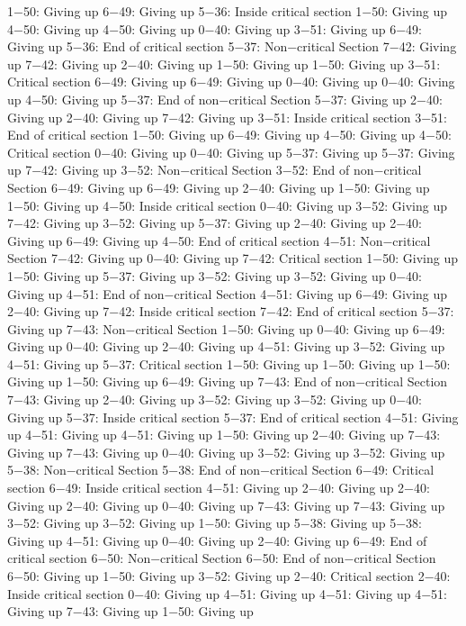1−50: Giving up
6−49: Giving up
5−36: Inside critical section
1−50: Giving up
4−50: Giving up
4−50: Giving up
0−40: Giving up
3−51: Giving up
6−49: Giving up
5−36: End of critical section
5−37: Non−critical Section
7−42: Giving up
7−42: Giving up
2−40: Giving up
1−50: Giving up
1−50: Giving up
3−51: Critical section
6−49: Giving up
6−49: Giving up
0−40: Giving up
0−40: Giving up
4−50: Giving up
5−37: End of non−critical Section
5−37: Giving up
2−40: Giving up
2−40: Giving up
7−42: Giving up
3−51: Inside critical section
3−51: End of critical section
1−50: Giving up
6−49: Giving up
4−50: Giving up
4−50: Critical section
0−40: Giving up
0−40: Giving up
5−37: Giving up
5−37: Giving up
7−42: Giving up
3−52: Non−critical Section
3−52: End of non−critical Section
6−49: Giving up
6−49: Giving up
2−40: Giving up
1−50: Giving up
1−50: Giving up
4−50: Inside critical section
0−40: Giving up
3−52: Giving up
7−42: Giving up
3−52: Giving up
5−37: Giving up
2−40: Giving up
2−40: Giving up
6−49: Giving up
4−50: End of critical section
4−51: Non−critical Section
7−42: Giving up
0−40: Giving up
7−42: Critical section
1−50: Giving up
1−50: Giving up
5−37: Giving up
3−52: Giving up
3−52: Giving up
0−40: Giving up
4−51: End of non−critical Section
4−51: Giving up
6−49: Giving up
2−40: Giving up
7−42: Inside critical section
7−42: End of critical section
5−37: Giving up
7−43: Non−critical Section
1−50: Giving up
0−40: Giving up
6−49: Giving up
0−40: Giving up
2−40: Giving up
4−51: Giving up
3−52: Giving up
4−51: Giving up
5−37: Critical section
1−50: Giving up
1−50: Giving up
1−50: Giving up
1−50: Giving up
6−49: Giving up
7−43: End of non−critical Section
7−43: Giving up
2−40: Giving up
3−52: Giving up
3−52: Giving up
0−40: Giving up
5−37: Inside critical section
5−37: End of critical section
4−51: Giving up
4−51: Giving up
4−51: Giving up
1−50: Giving up
2−40: Giving up
7−43: Giving up
7−43: Giving up
0−40: Giving up
3−52: Giving up
3−52: Giving up
5−38: Non−critical Section
5−38: End of non−critical Section
6−49: Critical section
6−49: Inside critical section
4−51: Giving up
2−40: Giving up
2−40: Giving up
2−40: Giving up
0−40: Giving up
7−43: Giving up
7−43: Giving up
3−52: Giving up
3−52: Giving up
1−50: Giving up
5−38: Giving up
5−38: Giving up
4−51: Giving up
0−40: Giving up
2−40: Giving up
6−49: End of critical section
6−50: Non−critical Section
6−50: End of non−critical Section
6−50: Giving up
1−50: Giving up
3−52: Giving up
2−40: Critical section
2−40: Inside critical section
0−40: Giving up
4−51: Giving up
4−51: Giving up
4−51: Giving up
7−43: Giving up
1−50: Giving up
